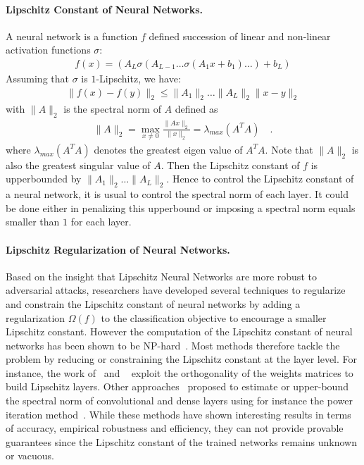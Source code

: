 \paragraph{Lipschitz Constant of Neural Networks.}  A neural network is a function $f$ defined succession of linear and non-linear activation functions $\sigma$:
\begin{align*}
  f(x) = \left(A_L\sigma\left(A_{L-1}\dots \sigma\left(A_1x+b_1\right)\dots\right)+b_L\right)
\end{align*}
Assuming that $\sigma$ is $1$-Lipschitz, we have:
\begin{align*}
  \lVert f(x)-f(y)\rVert_2\leq \lVert A_1\rVert_2\dots \lVert A_L\rVert_2\lVert x-y\rVert_2
\end{align*}
with $\lVert A\rVert_2$ is the spectral norm of $A$ defined as
\begin{align*}
  \lVert A\rVert_2 = \max_{x\neq 0} \frac{\lVert Ax\rVert_2}{\lVert x\rVert_2} = \lambda_{max}(A^TA)\quad.
\end{align*}
where $\lambda_{max}(A^TA)$ denotes the greatest eigen value of $A^TA$. Note that $\lVert A\rVert_2$ is also the greatest singular value of $A$.  
Then the Lipschitz constant of $f$ is upperbounded by $\lVert A_1\rVert_2\dots \lVert A_L\rVert_2$. Hence to control the Lipschitz constant of a neural network, it is usual to control the spectral norm of each layer. It could be done either in penalizing this upperbound or imposing a spectral norm equals smaller than $1$ for each layer. 

\paragraph{Lipschitz Regularization of Neural Networks.}  Based on the insight that Lipschitz Neural Networks are more robust to adversarial attacks, researchers have developed several techniques to regularize and constrain the Lipschitz constant of neural networks by adding a regularization $\Omega(f)$ to the classification objective to encourage a smaller Lipschitz constant.
However the computation of the Lipschitz constant of neural networks has been shown to be NP-hard~\citep{scaman2018lipschitz}.  Most methods therefore tackle the problem by reducing or constraining the Lipschitz constant at the layer level.
For instance, the work of~\citet{cisse2017parseval,huang2020controllable} and ~\citet{wang2020orthogonal} exploit the orthogonality of the weights matrices to build Lipschitz layers.
Other approaches~\citep{gouk2018regularisation,jia2017improving,sedghi2018singular,singla2021fantastic,araujo2021lipschitz} proposed to estimate or upper-bound the spectral norm of convolutional and dense layers using for instance the power iteration method~\citep{golub2000eigenvalue}.
While these methods have shown interesting results in terms of accuracy, empirical robustness and efficiency, they can not provide provable guarantees since the Lipschitz constant of the trained networks remains unknown or vacuous.



